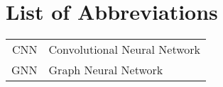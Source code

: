 \chapter*{List of Abbreviations}

\begin{tabular}{rl}
	CNN & Convolutional Neural Network\\
	GNN & Graph Neural Network\\
\end{tabular}
